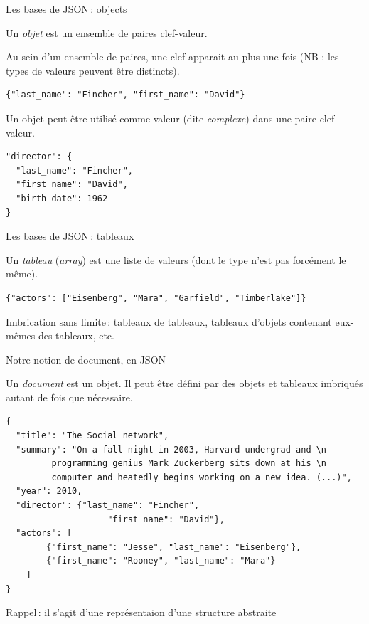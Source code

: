 \begin{frame}{Les bases de JSON\,: objects}

Un \textit{objet} est un ensemble de paires clef-valeur.

\vfill

Au sein d'un ensemble de paires, une clef apparait au plus une fois 
(NB : les types de valeurs peuvent être distincts).

\begin{verbatim}
{"last_name": "Fincher", "first_name": "David"}
\end{verbatim}

\vfill

Un objet peut être utilisé comme valeur (dite \textit{complexe}) dans une paire clef-valeur.

\begin{verbatim}
"director": { 
  "last_name": "Fincher",
  "first_name": "David", 
  "birth_date": 1962
}
\end{verbatim}


\end{frame}

\begin{frame}{Les bases de JSON\,: tableaux}


Un \textit{tableau} (\textit{array}) est une liste 
 de valeurs (dont le type n'est pas forcément le même).

\begin{verbatim}
{"actors": ["Eisenberg", "Mara", "Garfield", "Timberlake"]}
\end{verbatim}

\vfill

Imbrication sans limite\,: tableaux de tableaux, tableaux d'objets contenant eux-mêmes des tableaux, etc.


\end{frame}

\begin{frame}{Notre notion de document, en JSON}


Un \textit{document} est un objet. Il peut être défini par des objets et tableaux imbriqu\' es autant de fois que nécessaire.

\begin{verbatim}
{
  "title": "The Social network", 
  "summary": "On a fall night in 2003, Harvard undergrad and \n
         programming genius Mark Zuckerberg sits down at his \n 
         computer and heatedly begins working on a new idea. (...)",
  "year": 2010, 
  "director": {"last_name": "Fincher",
                    "first_name": "David"},
  "actors": [ 
        {"first_name": "Jesse", "last_name": "Eisenberg"}, 
        {"first_name": "Rooney", "last_name": "Mara"}
    ]
}
\end{verbatim}

\vfill

Rappel\,: il s'agit d'une \alert{représentaion} d'une structure abstraite
\end{frame}



